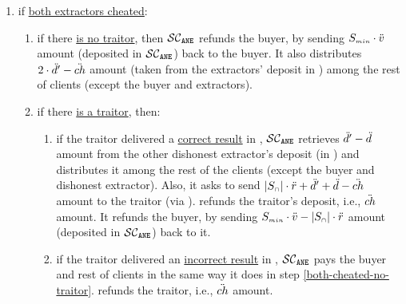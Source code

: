 \begin{itemize}
\begin{enumerate}
%
\item if \underline{both extractors cheated}:
%
\begin{enumerate}
%
\item\label{both-cheated-no-traitor} if there \underline{is no traitor}, then $\mathcal{SC}_{\mathtt{ANE}}$ refunds the buyer, by sending $S_{\scriptscriptstyle min}\cdot \ddot{v}$ amount (deposited in $\mathcal{SC}_{\mathtt{ANE}}$) back to the buyer. It also distributes $2\cdot \ddot{d}'- \ddot{ch}$ amount (taken from the extractors' deposit in \SCpc) among the rest of  clients  (except the buyer and extractors). %
%
%
\item if there \underline{is a traitor}, then:
\begin{enumerate}
%
%
\item\label{both-cheated-honest-traitor} if the traitor delivered a \underline{correct result} in \SCtc, $\mathcal{SC}_{\mathtt{ANE}}$ retrieves $\ddot{d}'-\ddot{d}$ amount from the other dishonest extractor's deposit (in \SCpc) and distributes it among the rest of the clients (except the buyer and dishonest extractor). Also, it asks \SCpc to send $|S_{\scriptscriptstyle\cap}|\cdot \ddot{r}+\ddot{d}'+\ddot{d}-\ddot{ch}$ amount to the traitor (via \SCtc). %
%
\SCtc refunds the traitor's deposit, i.e., $\ddot{ch}$ amount. It refunds the buyer, by sending $S_{\scriptscriptstyle min}\cdot \ddot{v}-|S_{\scriptscriptstyle\cap}|\cdot \ddot{r}$ amount (deposited in $\mathcal{SC}_{\mathtt{ANE}}$) back to it.


%
\item if the traitor delivered an \underline{incorrect result} in \SCtc, $\mathcal{SC}_{\mathtt{ANE}}$ pays the buyer and rest of clients in the same way it does in step \ref{both-cheated-no-traitor}. 
%
%
%
\SCtc refunds the traitor, i.e., $\ddot{ch}$ amount.  %



\end{enumerate}
\end{enumerate}
\end{enumerate}
\end{itemize}
